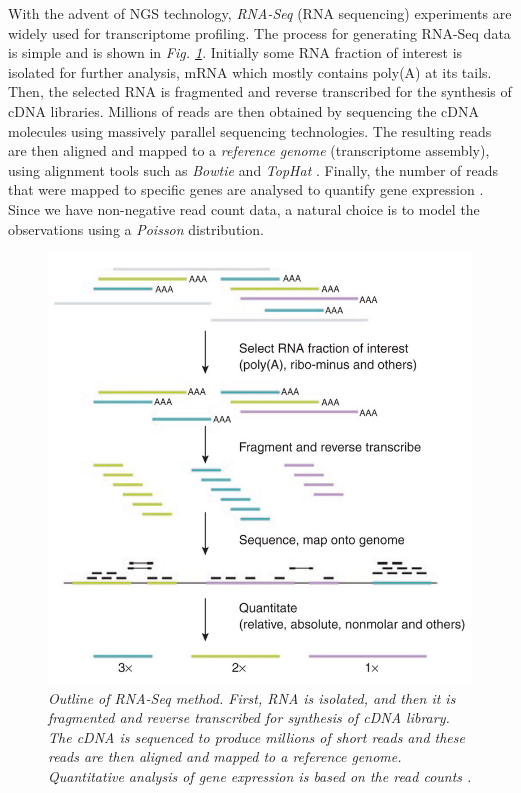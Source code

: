 With the advent of NGS technology, \emph{RNA-Seq} (RNA sequencing) experiments \citep{Wang2009} are widely used for transcriptome profiling. The process for generating RNA-Seq data is simple and is shown in \emph{Fig. \ref{rnaSeq-pic}}. Initially some RNA fraction of interest is isolated for further analysis, \eg mRNA which mostly contains poly(A) at its tails. Then, the selected RNA is fragmented and reverse transcribed for the synthesis of cDNA libraries. Millions of reads are then obtained by sequencing the cDNA molecules using massively parallel sequencing technologies. The resulting reads are then aligned and mapped to a \emph{reference genome} (\ie transcriptome assembly), using alignment tools such as \emph{Bowtie} \citep{Langmead2009} and \emph{TopHat} \citep{Trapnell2009}. Finally, the number of reads that were mapped to specific genes are analysed to quantify gene expression \citep{Pepke2009}. Since we have non-negative read count data, a natural choice is to model the observations using a \emph{Poisson} distribution.
\begin{figure}[!ht]
\begin{center}
 \includegraphics[scale = 0.37]{images/rna-seq}
\caption{\emph{Outline of RNA-Seq method. First, RNA is isolated, and then it is fragmented and reverse transcribed for synthesis of cDNA library. The cDNA is sequenced to produce millions of short reads and these reads are then aligned and mapped to a reference genome. Quantitative analysis of gene expression is based on the read counts \citep{Pepke2009}.}}
\label{rnaSeq-pic}
\end{center}
\end{figure}

